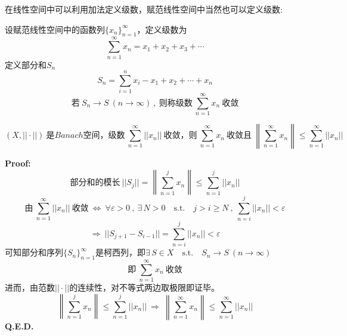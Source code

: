 在线性空间中可以利用加法定义级数，赋范线性空间中当然也可以定义级数:
\begin{definition}
    设赋范线性空间中的函数列$\{x_n\}_{n=1}^{\infty}$，定义级数为
    \[\sum_{n=1}^{\infty}x_n=x_1+x_2+x_3+\cdots\]
    定义部分和$S_n$
    \[S_n=\sum_{i=1}^nx_i-x_1+x_2+\cdots+x_n\]
    \[\text{若} \ S_n \to S \ (n \to \infty) \ , \ \text{则称级数} \ \sum_{n=1}^{\infty}x_n \ \text{收敛}\]
\end{definition}
\begin{theorem}
    \[(X,||\cdot||) \ \text{是$Banach$空间，级数} \ \sum_{n=1}^{\infty}||x_n|| \ \text{收敛，则} \ \sum_{n=1}^{\infty}x_n \ \text{收敛且} \ \left\| \sum_{n=1}^{\infty}x_n \right\| \leq \sum_{n=1}^{\infty}||x_n||\]
\end{theorem}
\textbf{Proof:}
\[\text{部分和的模长} \ ||S_j||=\left\| \sum_{n=1}^jx_n \right\| \leq \sum_{n=1}^j||x_n||\]
\[\text{由} \ \sum_{n=1}^{\infty}||x_n|| \ \text{收敛} \ \Leftrightarrow \ \forall \varepsilon>0 \ , \ \exists \, N>0 \quad \text{s.t.} \quad j>i \geq N \ , \ \sum_{n=i}^j||x_n||<\varepsilon\]
\[\Rightarrow \ ||S_{j+1}-S_{i-1}||=\sum_{n=i}^j||x_n||<\varepsilon\]
可知部分和序列$\{S_n\}_{n=1}^{\infty}$是柯西列，即$\exists \, S \in X \quad \text{s.t.} \quad S_n \to S \ (n \to \infty)$
\[\text{即} \ \sum_{n=1}^{\infty}x_n \ \text{收敛}\]
进而，由范数$||\cdot||$的连续性，对不等式两边取极限即证毕。
\[\left\| \sum_{n=1}^jx_n \right\| \leq \sum_{n=1}^j||x_n|| \ \Rightarrow \ \left\| \sum_{n=1}^{\infty}x_n \right\| \leq \sum_{n=1}^{\infty}||x_n||\]
\textbf{Q.E.D.}

